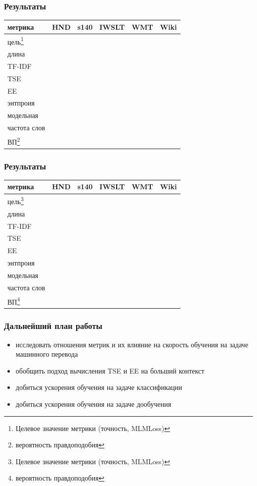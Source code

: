 \documentclass{beamer}
\begin{document}
\begin{frame}
	\frametitle{Результаты}
	\begin{table}
		\begin{tabular}{l|cc|cc|c}
			метрика & HND & s140 & IWSLT & WMT & Wiki \\
			\hline
			цель\footnote[1]{Целевое значение метрики (точность, MLMLoss)} &&&&&\\
			\hline
			длина &&&&& \\
			TF-IDF &&&&& \\
			TSE &&&&& \\
			EE &&&&& \\
			энтпроия &&&&& \\
			модельная &&&&& \\
			частота слов &&&&& \\
			ВП\footnote[2]{вероятность правдоподобия} &&&&& \\
			\hline
		\end{tabular}
	\end{table}
\end{frame}

\begin{frame}
	\frametitle{Результаты}
	\begin{table}
		\begin{tabular}{l|cc|cc|c}
			метрика & HND & s140 & IWSLT & WMT & Wiki \\
			\hline
			цель\footnote[1]{Целевое значение метрики (точность, MLMLoss)} &&&&&\\
			\hline
			длина &&&&& \\
			TF-IDF &&&&& \\
			TSE &&&&& \\
			EE &&&&& \\
			энтпроия &&&&& \\
			модельная &&&&& \\
			частота слов &&&&& \\
			ВП\footnote[2]{вероятность правдоподобия} &&&&& \\
			\hline
		\end{tabular}
	\end{table}
\end{frame}

\begin{frame}
	\frametitle{Дальнейший план работы}
	\begin{itemize}
		\item исследовать отношения метрик и их влияние на скорость обучения на задаче машинного перевода
		\item обобщить подход вычисления TSE и EE на больший контекст
		\item добиться ускорения обучения на задаче классификации
		\item добиться ускорения обучения на задаче дообучения
	\end{itemize}
\end{frame}
\end{document}
